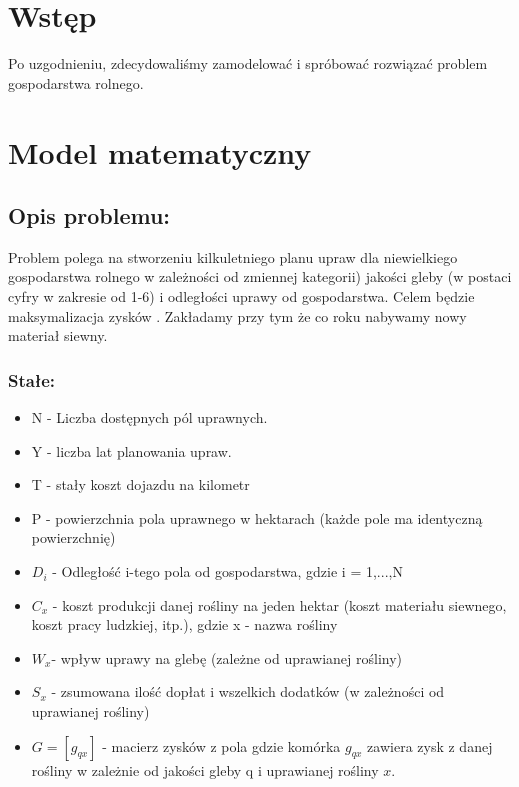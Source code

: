 \documentclass[12pt,a4paper]{article}
\begin{document}
\tableofcontents

\section{Wstęp}
Po uzgodnieniu, zdecydowaliśmy zamodelować i spróbować rozwiązać problem gospodarstwa rolnego. 


\section{Model matematyczny}

	\subsection{Opis problemu:}
	Problem polega na stworzeniu kilkuletniego planu upraw dla niewielkiego gospodarstwa rolnego w zależności od zmiennej kategorii) jakości gleby (w postaci cyfry w zakresie od 1-6) i  odległości uprawy od gospodarstwa. Celem będzie maksymalizacja zysków . Zakładamy przy tym że co roku nabywamy nowy materiał siewny.

	\subsubsection{Stałe:}
	\begin{itemize}
		\item N - Liczba dostępnych pól uprawnych.
		
		\item Y - liczba lat planowania upraw.
		
		\item T - stały koszt dojazdu na kilometr
		
		\item P - powierzchnia pola uprawnego w hektarach (każde pole ma identyczną powierzchnię)
		
		\item $ D_i $ -  Odległość i-tego pola od gospodarstwa, gdzie i = 1,...,N
		
		\item $ C_x $ - koszt produkcji danej rośliny na jeden hektar (koszt materiału siewnego, koszt pracy ludzkiej, itp.), gdzie x - nazwa rośliny
		
		\item $ W_x $- wpływ uprawy na glebę (zależne od uprawianej rośliny)
		
		\item $ S_x $ - zsumowana ilość dopłat i  wszelkich dodatków (w zależności od uprawianej rośliny)
		
		\item $ G = [g_{qx}] $ - macierz zysków z pola gdzie komórka  $ g_{qx} $ zawiera zysk z danej rośliny w zależnie od jakości gleby q i uprawianej rośliny $ x $.
	\end{itemize}
\end{document}

